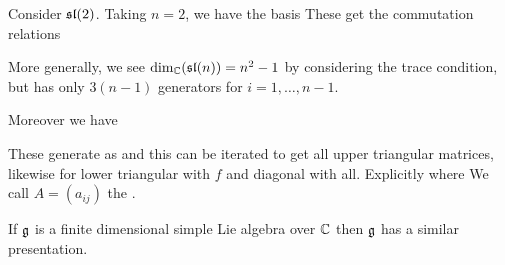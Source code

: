 \documentclass{article}
\begin{document}
\begin{example}
Consider $\mathfrak{sl}(2)$. Taking $n=2$, we have the basis 
These get the commutation relations 
\end{example}

More generally, we see $\dim_{\mathbb{C}}(\mathfrak{sl}(n)) = n^2 -1$ by considering the trace condition, but has only $3(n-1)$ generators 
for $i = 1, \dots, n-1$. 
\begin{ex}
Moreover we have
\end{ex}
These generate as 
and this can be iterated to get all upper triangular matrices, likewise for lower triangular with $f$ and diagonal with all. Explicitly 
where 
We call $A = (a_{ij})$ the . 

\begin{theorem}[Serre]
If $\mathfrak{g}$ is a finite dimensional simple Lie algebra over $\mathbb{C}$ then $\mathfrak{g}$ has a similar presentation. 
\end{theorem}
\end{document}
